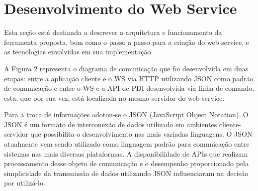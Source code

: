 \documentclass[12pt]{article}
\begin{document}
\section{Desenvolvimento do Web Service}

Esta seção está destinada a descrever a arquitetura e funcionamento da ferramenta proposta, bem como o passo a passo para a criação do web service, e as tecnologias envolvidas em sua implementação.



A Figura 2 representa o diagrama de comunicação que
foi desenvolvida em duas etapas: entre a aplicação cliente e o WS via HTTP utilizando JSON como padrão de comunicação e entre
o WS e a API de PDI desenvolvida via linha de comando, esta, que por sua vez, está localizada no mesmo servidor do web service.

Para a troca de informações adotou-se o JSON (JavaScript Object Notation). O
JSON é um formato de interconexão de dados utilizado em ambientes cliente-servidor
que possibilita o desenvolvimento nas mais variadas linguagens. O JSON atualmente
vem sendo utilizado como linguagem padrão para comunicação entre sistemas nas mais
diversas plataformas. A disponibilidade de APIs que realizam processamento desse objeto de comunicação e o desempenho proporcionado
pela simplicidade da transmissão de dados utilizando JSON influenciaram na decisão
por utilizá-lo.
\end{document}
